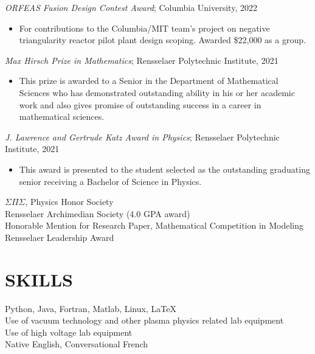 \documentclass[margin]{rpires}
\begin{document}
\begin{resume}
\textit{ORFEAS Fusion Design Contest Award}; Columbia University, 2022
\begin{itemize}
    \item[] {For contributions to the Columbia/MIT team's project on negative triangularity reactor pilot plant design scoping. Awarded \$22,000 as a group.}
\end{itemize}
\vspace{-0.4cm}

\textit{Max Hirsch Prize in Mathematics}; Rensselaer Polytechnic Institute, 2021
\begin{itemize}
    \item[] {This prize is awarded to a Senior in the Department of Mathematical Sciences who has demonstrated outstanding ability in his or her academic work and also gives promise of outstanding success in a career in mathematical sciences.}
\end{itemize}
\vspace{-0.4cm}

\textit{J. Lawrence and Gertrude Katz Award in Physics}; Rensselaer Polytechnic Institute, 2021
\begin{itemize} 
    \item[] {This award is presented to the student selected as the outstanding graduating senior receiving a Bachelor of Science in Physics.}
\end{itemize}
\vspace{-0.4cm}

$\Sigma \Pi \Sigma$, Physics Honor Society \\
Rensselaer Archimedian Society (4.0 GPA award) \\
Honorable Mention for Research Paper,       Mathematical Competition in Modeling \\
Rensselaer Leadership Award 
 
\section{SKILLS}
Python, Java, Fortran, Matlab, Linux, \LaTeX\\
Use of vacuum technology and other plasma physics related lab equipment\\
Use of high voltage lab equipment\\
Native English, Conversational French\\

 
\end{resume} 
\end{document}
